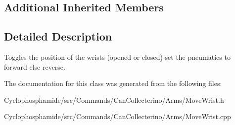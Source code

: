 \subsection*{Additional Inherited Members}


\subsection{Detailed Description}
Toggles the position of the wrists (opened or closed) set the pneumatics to forward else reverse. 

The documentation for this class was generated from the following files\+:\begin{DoxyCompactItemize}
\item 
Cyclophosphamide/src/\+Commands/\+Can\+Collecterino/\+Arms/Move\+Wrist.\+h\item 
Cyclophosphamide/src/\+Commands/\+Can\+Collecterino/\+Arms/Move\+Wrist.\+cpp\end{DoxyCompactItemize}
